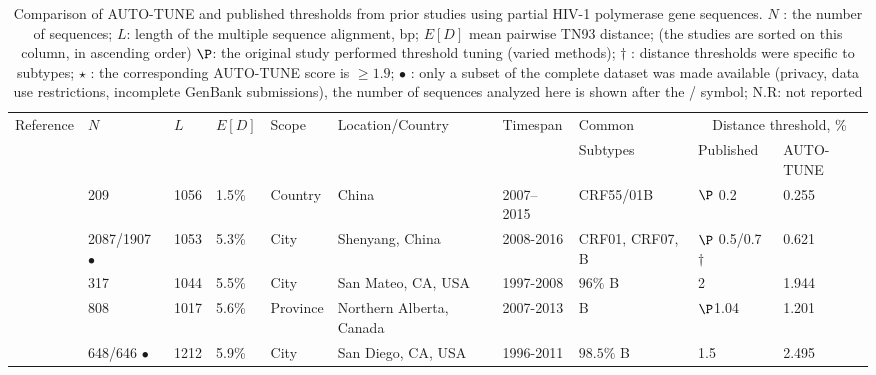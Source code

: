 \documentclass[utf8]{FrontiersinHarvard} %
\begin{document}
\begin{table}[h]
	\caption{Comparison of AUTO-TUNE and published thresholds from prior studies using partial HIV-1 polymerase gene sequences. $N$ : the number of sequences; $L$: length of the multiple sequence alignment, bp; $E[D]$ mean pairwise TN93 distance; (the studies are sorted on this column, in ascending order) $\P$: the original study performed threshold tuning (varied methods); $\dagger$ : distance thresholds were specific to subtypes; $\star$ : the corresponding AUTO-TUNE score is $\geq 1.9$; $\bullet$ : only a subset of the complete dataset was made available (privacy, data use restrictions, incomplete GenBank submissions), the number of  sequences analyzed here is shown after the / symbol; N.R: not reported}

	\vspace{10pt}
	\centering
	\begin{ssmall}
		\label{tab:paperComparison}
		\begin{tabular}{llllllllll}
			\hline
			Reference                   & $N$                 & $L$  & $E[D]$ & Scope      & Location/Country         & Timespan  & Common                & \multicolumn{2}{c}{Distance threshold, \%}                  \\
			                            &                     &      &        &            &                          &           & Subtypes              & Published                                  & AUTO-TUNE      \\
			\hline
			\cite{Zai:2020aa}           & 209                 & 1056 & 1.5\%  & Country    & China                    & 2007–2015 & CRF55/01B             & $\P$ 0.2                                   & 0.255          \\
			\cite{liu_dynamics_2020}    & 2087/1907 $\bullet$ & 1053 & 5.3\%  & City       & Shenyang, China          & 2008-2016 & CRF01, CRF07, B       & $\P$ 0.5/0.7 $\dagger$                     & 0.621          \\
			\cite{dalai_combining_2018} & 317                 & 1044 & 5.5\%  & City       & San Mateo, CA, USA       & 1997-2008 & $96\%$ B              & 2                                          & 1.944          \\
			\cite{chato_public_2020}    & 808                 & 1017 & 5.6\%  & Province   & Northern Alberta, Canada & 2007-2013 & B                     & $\P$1.04                                   & 1.201          \\
			\cite{Little:2014aa}        & 648/646 $\bullet$   & 1212 & 5.9\%  & City       & San Diego, CA, USA       & 1996-2011 & $98.5\%$ B            & 1.5                                        & 2.495          \\

\end{tabular}
\end{ssmall}
\end{table}
\end{document}
